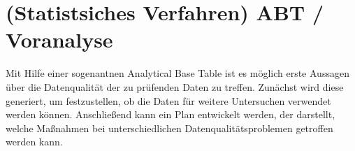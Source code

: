 \section{(Statistsiches Verfahren) ABT / Voranalyse}
Mit Hilfe einer sogenantnen Analytical Base Table ist es möglich erste Aussagen über die Datenqualität der zu prüfenden Daten zu treffen.
Zunächst wird diese generiert, um festzustellen, ob die Daten für weitere Untersuchen verwendet werden können.
Anschließend kann ein Plan entwickelt werden, der darstellt, welche Maßnahmen bei unterschiedlichen Datenqualitätsproblemen getroffen werden kann.

